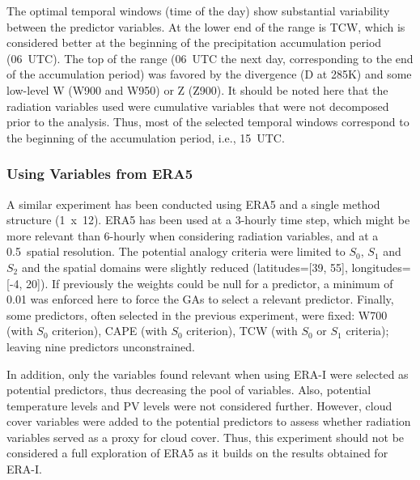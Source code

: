 \documentclass[draft]{agujournal2019}
\begin{document}
The optimal temporal windows (time of the day) show substantial variability between the predictor variables. At the lower end of the range is TCW, which is considered better at the beginning of the precipitation accumulation period (06~UTC). The top of the range (06~UTC the next day, corresponding to the end of the accumulation period) was favored by the divergence (D at 285\degree K) and some low-level W (W900 and W950) or Z (Z900). It should be noted here that the radiation variables used were cumulative variables that were not decomposed prior to the analysis. Thus, most of the selected temporal windows correspond to the beginning of the accumulation period, i.e., 15~UTC.


\subsubsection{Using Variables from ERA5}

A similar experiment has been conducted using ERA5 and a single method structure (1~x~12). ERA5 has been used at a 3-hourly time step, which might be more relevant than 6-hourly when considering radiation variables, and at a 0.5\degree\ spatial resolution. The potential analogy criteria were limited to $S_{0}$, $S_{1}$ and $S_{2}$ and the spatial domains were slightly reduced (latitudes=[39, 55], longitudes=[-4, 20]). If previously the weights could be null for a predictor, a minimum of 0.01 was enforced here to force the GAs to select a relevant predictor. Finally, some predictors, often selected in the previous experiment, were fixed: W700 (with $S_{0}$ criterion), CAPE (with $S_{0}$ criterion), TCW (with $S_{0}$ or $S_{1}$ criteria); leaving nine predictors unconstrained.

In addition, only the variables found relevant when using ERA-I were selected as potential predictors, thus decreasing the pool of variables. Also, potential temperature levels and PV levels were not considered further. However, cloud cover variables were added to the potential predictors to assess whether radiation variables served as a proxy for cloud cover. Thus, this experiment should not be considered a full exploration of ERA5 as it builds on the results obtained for ERA-I.
\end{document}
